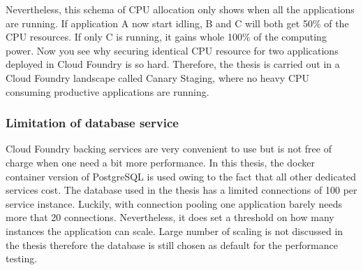 Nevertheless, this schema of CPU allocation only shows when all the applications are running. If application A now start idling, B and C will both get 50\% of the CPU resources. If only C is running, it gains whole 100\% of the computing power. Now you see why securing identical CPU resource for two applications deployed in Cloud Foundry is so hard. Therefore, the thesis is carried out in a Cloud Foundry landscape called Canary Staging, where no heavy CPU consuming productive applications are running. \\
\subsubsection{Limitation of database service}
Cloud Foundry backing services are very convenient to use but is not free of charge when one need a bit more performance. In this thesis, the docker container version of PostgreSQL is used owing to the fact that all other dedicated services cost. The database used in the thesis has a limited connections of 100 per service instance. Luckily,  with connection pooling one application barely needs more that 20 connections. Nevertheless, it does set a threshold on how many instances the application can scale. Large number of scaling is not discussed in the thesis therefore the database is still chosen as default for the performance testing. \\

